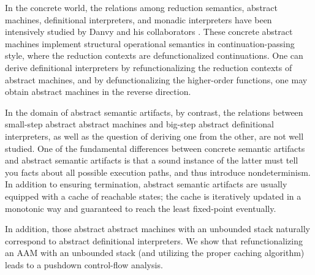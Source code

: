 \documentclass[acmsmall, review]{acmart}\settopmatter{}
\begin{document}
In the concrete world, the relations among reduction semantics, abstract machines,
definitional interpreters, and monadic interpreters have been intensively studied by
Danvy and his collaborators \cite{Ager:2003:FCE:888251.888254, Danvy:2001:DW:773184.773202,
danvy2004refocusing, Danvy:2008:DIP:1411204.1411206, AGER2004223, ager2005functional,
Danvy:2006:RW:2171265.2171268, danvy2009towards, biernacka2009towards}.
These concrete abstract machines implement structural operational semantics in 
continuation-passing style, where the reduction contexts are defunctionalized continuations.
One can derive definitional interpreters by refunctionalizing the reduction contexts of
abstract machines, and by defunctionalizing the higher-order functions, one may obtain
abstract machines in the reverse direction.

In the domain of abstract semantic artifacts, by contrast, the relations between small-step
abstract abstract machines and big-step abstract definitional interpreters, as well as the
question of deriving one from the other, are not well studied.
One of the fundamental differences between concrete semantic artifacts and abstract semantic
artifacts is that a sound instance of the latter must tell you facts about all possible execution 
paths, and thus introduce nondeterminism. In addition to ensuring termination, abstract semantic
artifacts are usually equipped with a cache of reachable states; the cache is
iteratively updated in a monotonic way and guaranteed to reach the least fixed-point eventually.

In addition, those abstract abstract machines with an unbounded stack naturally correspond
to abstract definitional interpreters. We show that refunctionalizing an AAM with an
unbounded stack (and utilizing the proper caching algorithm) leads to a pushdown control-flow analysis.
\end{document}
